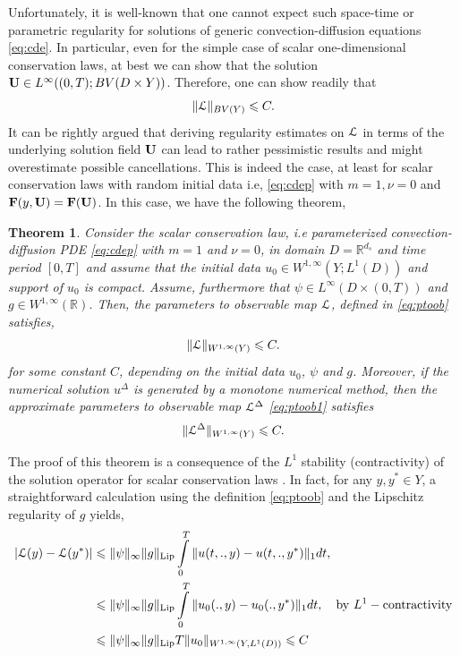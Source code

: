 \documentclass[a4paper]{article}
\numberwithin{equation}{section}
\newtheorem{theorem}{Theorem}[section]
\numberwithin{equation}{section}
\theoremstyle{definition}
\theoremstyle{myremarkstyle}
\renewcommand{\leq}{\leqslant}
\newcommand{\R}{\mathbb{R}}
\newcommand{\U}{{\bf U}}		%
\newcommand{\map}{\EuScript{L}}
\begin{document}
Unfortunately, it is well-known that one cannot expect such space-time or parametric regularity for solutions of generic convection-diffusion equations \eqref{eq:cde}. In particular, even for the simple case of scalar one-dimensional conservation laws, at best we can show that the solution $\U \in L^{\infty}((0,T);BV(D\times Y))$. Therefore, one can show readily that 
\begin{equation}
\label{eq:reg4}
\|\map\|_{BV(Y)} \leq C.
\end{equation}
It can be rightly argued that deriving regularity estimates on $\map$ in terms of the underlying solution field $\U$ can lead to rather pessimistic results and might overestimate possible cancellations. This is indeed the case, at least for scalar conservation laws with random initial data i.e, \eqref{eq:cdep} with $m=1, \nu = 0$ and ${\bf F}(y,\U) = {\bf F}(\U)$. In this case, we have the following theorem,
\begin{theorem}
\label{theo:21}
Consider the scalar conservation law, i.e parameterized convection-diffusion PDE \eqref{eq:cdep} with $m=1$ and $\nu = 0$, in domain $D = \R^ {d_s}$ and time period $[0,T]$ and assume that the initial data $u_0 \in W^{1,\infty}\left(Y;L^1(D)\right)$ and support of $u_0$ is compact. Assume, furthermore that $\psi \in L^{\infty}(D \times (0,T))$ and $g \in W^{1,\infty} (\R)$. Then, the parameters to observable map $\map$, defined in \eqref{eq:ptoob} satisfies,
\begin{equation}
\label{eq:reg6}
\|\map\|_{W^{1,\infty}(Y)} \leq C.
\end{equation}
for some constant $C$, depending on the initial data $u_0$, $\psi$ and $g$. Moreover, if the numerical solution $u^{\Delta}$ is generated by a monotone numerical method, then the approximate parameters to observable map $\map^{\Delta}$ \eqref{eq:ptoob1} satisfies
\begin{equation}
\label{eq:reg7}
\|\map^{\Delta}\|_{W^{1,\infty}(Y)} \leq C.
\end{equation}
\end{theorem}
The proof of this theorem is a consequence of the $L^1$ stability (contractivity) of the solution operator for scalar conservation laws \cite{DAF1}. In fact, for any $y,y^{\ast} \in Y$, a 
straightforward calculation using the definition \eqref{eq:ptoob} and the Lipschitz regularity of $g$ yields,
\begin{align*}
    |\map(y) - \map(y^{\ast})| &\leq \|\psi\|_{\infty} \|g\|_{{\rm Lip}}\int\limits_0^T \|u(t,.,y) - u(t,.,y^{\ast})\|_{1} dt, \\
    &\leq \|\psi\|_{\infty} \|g\|_{{\rm Lip}}\int\limits_0^T \|u_0(.,y) - u_0(.,y^{\ast})\|_{1} dt, \quad {\rm by~}L^1-{\rm contractivity} \\
    &\leq \|\psi\|_{\infty} \|g\|_{{\rm Lip}} T \|u_0\|_{W^{1,\infty}(Y,L^1(D))} \leq C
\end{align*}
\end{document}

